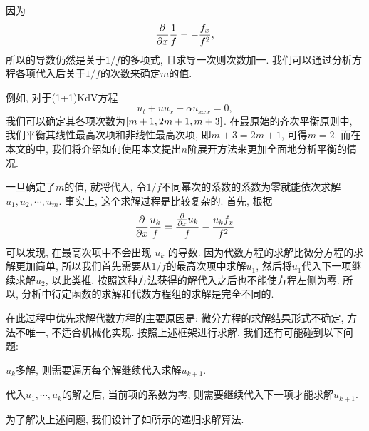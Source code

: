 因为
\begin{equation}
    \frac{\partial}{\partial x}\frac{1}{f}=-\frac{f_x}{f^2},
\end{equation}
所以的导数仍然是关于$1/f$的多项式, 且求导一次则次数加一. 我们可以通过分析方程各项代入后关于$1/f$的次数来确定$m$的值.

例如, 对于(1+1)KdV方程\CITEaaKdV{}
\begin{equation}
    u_t+uu_x-\alpha u_{xxx}=0,
\end{equation}
我们可以确定其各项次数为$\left[m+1,2m+1,m+3\right]$. 在最原始的齐次平衡原则中, 我们平衡其线性最高次项和非线性最高次项, 即$m+3=2m+1$, 可得$m=2$. 而在本文的中, 我们将介绍如何使用本文提出$n$阶展开方法来更加全面地分析平衡的情况. 

一旦确定了$m$的值, 就将代入, 令$1/f$不同幂次的系数的系数为零就能依次求解$u_1,u_2,\cdots,u_m$. 事实上, 这个求解过程是比较复杂的. 首先, 根据 
\begin{equation}
    \frac{\partial}{\partial x}\frac{u_k}{f}=\frac{\frac{\partial}{\partial x}u_k}{f}-\frac{u_kf_x}{f^2}
\end{equation} 
可以发现, 在最高次项中不会出现 $u_k$ 的导数. 因为代数方程的求解比微分方程的求解更加简单, 所以我们首先需要从$1/f$的最高次项中求解$u_1$, 然后将$u_1$代入下一项继续求解$u_2$, 以此类推. 按照这种方法获得的解代入之后也不能使方程左侧为零. 所以, \Painleve{}分析中待定函数的求解和代数方程组的求解是完全不同的.

在此过程中优先求解代数方程的主要原因是: 微分方程的求解结果形式不确定, 方法不唯一, 不适合机械化实现. 按照上述框架进行求解, 我们还有可能碰到以下问题: 
\begin{compactenum}[(1)]
\item $u_k$多解, 则需要遍历每个解继续代入求解$u_{k+1}$.
\item 代入$u_1,\cdots,u_k$的解之后, 当前项的系数为零, 则需要继续代入下一项才能求解$u_{k+1}$. 
\end{compactenum}
为了解决上述问题, 我们设计了如所示的递归求解算法. 

